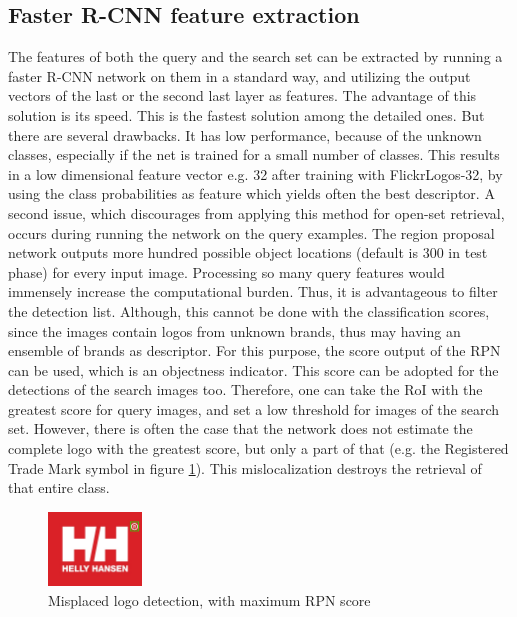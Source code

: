 \subsection{Faster R-CNN feature extraction}\label{ss:solution1}
The features of both the query and the search set can be extracted by running a faster R-CNN network on them in a standard way, and utilizing the output vectors of the last or the second last layer as features. The advantage of this solution is its speed. This is the fastest solution among the detailed ones. But there are several drawbacks. It has low performance, because of the unknown classes, especially if the net is trained for a small number of classes. This results in a low dimensional feature vector e.g. 32 after training with FlickrLogos-32, by using the class probabilities as feature which yields often the best descriptor. A second issue, which discourages from applying this method for open-set retrieval, occurs during running the network on the query examples.
\bigbreak
The region proposal network outputs more hundred possible object locations (default is 300 in test phase) for every input image. Processing so many query features would immensely increase the computational burden. Thus, it is advantageous to filter the detection list. Although, this cannot be done with the classification scores, since the images contain logos from unknown brands, thus may having an ensemble of brands as descriptor. For this purpose, the score output of the RPN can be used, which is an objectness indicator. This score can be adopted for the detections of the search images too. Therefore, one can take the RoI with the greatest score for query images, and set a low threshold for images of the search set.
\bigbreak
However, there is often the case that the network does not estimate the complete logo with the greatest score, but only a part of that (e.g. the Registered Trade Mark symbol in figure \ref{f:missdet}). This mislocalization destroys the retrieval of that entire class.
\begin{figure}
  \centering
  \includegraphics[width=25mm]{images/mt/missdet.jpg}
  \caption{Misplaced logo detection, with maximum RPN score}
  \label{f:missdet}
\end{figure}
